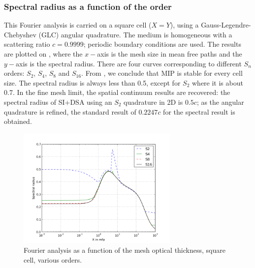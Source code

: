 \subsubsection{Spectral radius as a function of the \sn order}

This Fourier analysis is carried on a square cell ($X=Y$), using a
Gauss-Legendre-Chebyshev (GLC) angular quadrature. The medium is homogeneous with a 
scattering ratio $c=0.9999$; periodic boundary conditions are used. The results 
are plotted on , where the $x-$axis is the mesh size in mean free 
paths and the $y-$axis is the spectral radius. There are four curves corresponding 
to different $S_n$ orders: $S_2$, $S_4$, $S_8$ and $S_{16}$.
From , we conclude that MIP is stable for every 
cell size. The spectral radius is always less than 0.5, except for $S_2$ where 
it is about 0.7. In the fine mesh limit, the spatial continuum results are recovered:
the spectral radius of SI+DSA using an $S_2$ quadrature in 2D is $0.5c$; as the angular 
quadrature is refined, the standard result of $0.2247c$ for the spectral result is obtained.
\begin{figure}[!htbp]
  \centering
  \includegraphics[width=0.7\textwidth]{sn_order_9999}
  \caption{Fourier analysis as a function of the mesh optical thickness, square cell,
    various \sn orders.}
  \label{fig_fa_sn}
\end{figure}

